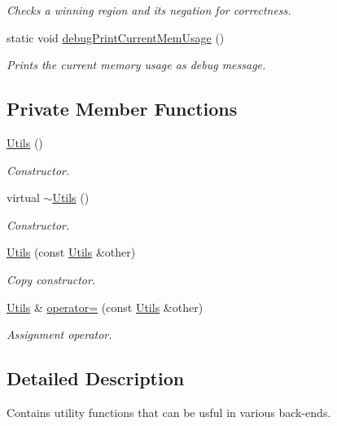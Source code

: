 \begin{DoxyCompactItemize}
\begin{DoxyCompactList}\small\item\em Checks a winning region and its negation for correctness. \end{DoxyCompactList}\item 
static void \hyperlink{classUtils_af69b7f70358d1c1616aab1560c7363cd}{debug\-Print\-Current\-Mem\-Usage} ()
\begin{DoxyCompactList}\small\item\em Prints the current memory usage as debug message. \end{DoxyCompactList}\end{DoxyCompactItemize}
\subsection*{Private Member Functions}
\begin{DoxyCompactItemize}
\item 
\hyperlink{classUtils_a452e78692c87ed5c7c993b6c6ac4981a}{Utils} ()
\begin{DoxyCompactList}\small\item\em Constructor. \end{DoxyCompactList}\item 
virtual \hyperlink{classUtils_a0d842a927296003dd7088fc1e4e2a367}{$\sim$\-Utils} ()
\begin{DoxyCompactList}\small\item\em Constructor. \end{DoxyCompactList}\item 
\hyperlink{classUtils_a80726f8ec2ed2707a8bfd4fd355ef27a}{Utils} (const \hyperlink{classUtils}{Utils} \&other)
\begin{DoxyCompactList}\small\item\em Copy constructor. \end{DoxyCompactList}\item 
\hyperlink{classUtils}{Utils} \& \hyperlink{classUtils_a0ed61b802f94ec15000c458e9aae4f19}{operator=} (const \hyperlink{classUtils}{Utils} \&other)
\begin{DoxyCompactList}\small\item\em Assignment operator. \end{DoxyCompactList}\end{DoxyCompactItemize}


\subsection{Detailed Description}
Contains utility functions that can be usful in various back-\/ends. 

